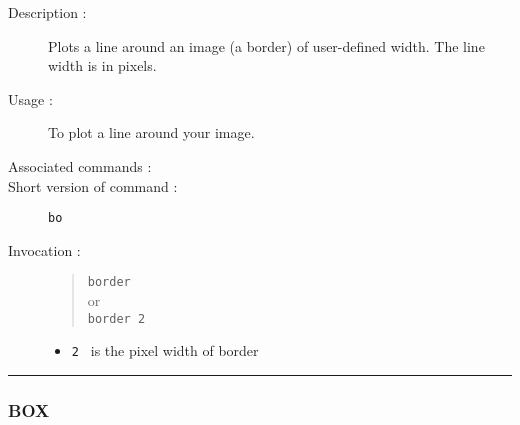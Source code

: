 \begin{description}

\item[Description :] Plots a line around an image (a border) of
user-defined width.  The line width is in pixels. 

\item[Usage :] To plot a line around your image.
\item[Associated commands :] {\tt {}}
\item[Short version of command :] {\tt bo}
\item[Invocation :]

\begin{quote}{\tt  border }\\
or \\
{\tt border 2 }
\end{quote}

\begin{itemize}

\item {\tt 2 } is the pixel width of border

\end{itemize}

\end{description}

\hrule 
\subsubsection*{\label{BOX}BOX}

